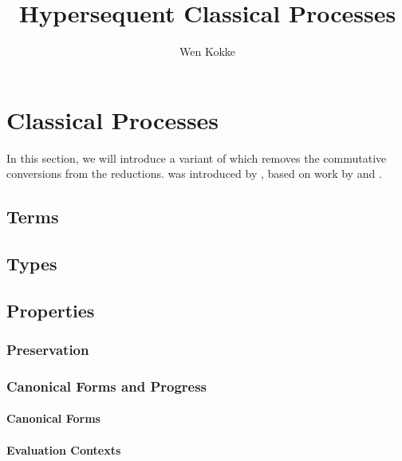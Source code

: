 \documentclass{article}
\author{Wen Kokke}
\title{Hypersequent Classical Processes}
\begin{document}
\section{Classical Processes}\label{sec:cp}
In this section, we will introduce a variant of \cp which removes the
commutative conversions from the reductions.
\cp was introduced by \textcite{wadler2012}, based on work by \textcite{caires2010}
and \textcite{gay2009}.

\subsection{Terms}\label{sec:cp-terms}




\subsection{Types}\label{sec:cp-types}






\subsection{Properties}\label{sec:cp-properties}

\subsubsection{Preservation}\label{sec:cp-preservation}




\subsubsection{Canonical Forms and Progress}\label{sec:cp-canonical-forms-and-progress}

\paragraph{Canonical Forms}\label{sec:cp-canonical-forms}


\paragraph{Evaluation Contexts}\label{sec:cp-evaluation-contexts}




\end{document}
